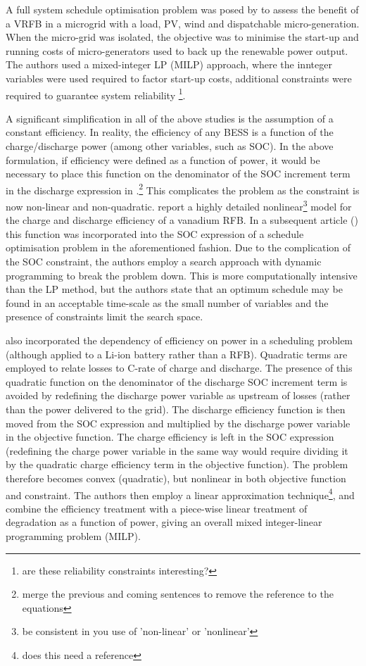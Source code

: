 \documentclass[preprint,3p,review,authoryear,10pt]{elsarticle}
\newcommand{\sol}[1]{\footnote{#1}\marginpar{\fbox{\thefootnote}}}
\begin{document}
A full system schedule optimisation problem was posed by \cite{Chen2012} to assess the benefit of a VRFB in a microgrid with a load, PV, wind and dispatchable micro-generation. When the micro-grid was isolated, the objective was to minimise the start-up and running costs of micro-generators used to back up the renewable power output. The authors used a mixed-integer LP (MILP) approach, where the innteger variables were used required to factor start-up costs, additional constraints were required to guarantee system reliability \sol{are these reliability constraints interesting?}. 

A significant simplification in all of the above studies is the assumption of a constant efficiency. In reality, the efficiency of any BESS is a function of the charge/discharge power (among other variables, such as SOC). In the above formulation, if efficiency were defined as a  function of power, it would be necessary to place this function on the denominator of the SOC increment term in the discharge expression in .\sol{merge the previous and coming sentences to remove the reference to the equations} This complicates the problem as the constraint is now non-linear and non-quadratic. \cite{Nguyen2014} report a highly detailed nonlinear\sol{be consistent in you use of 'non-linear' or 'nonlinear'} model for the charge and discharge efficiency of a vanadium RFB. In a subsequent article (\cite{Nguyen2015}) this function was incorporated into the SOC expression of a schedule optimisation problem in the aforementioned fashion. Due to the complication of the SOC constraint, the authors employ a search approach with dynamic programming to break the problem down. This is more computationally intensive than the LP method, but the authors state that an optimum schedule may be found in an acceptable time-scale as the small number of variables and the presence of constraints limit the search space.

\cite{Sarker2017} also incorporated the dependency of efficiency on power in a scheduling problem (although applied to a Li-ion battery rather than a RFB). Quadratic terms are employed to relate losses to C-rate of charge and discharge. The presence of this quadratic function on the denominator of the discharge SOC increment term is avoided by redefining the discharge power variable as upstream of losses (rather than the power delivered to the grid). The discharge efficiency function is then moved from the SOC expression and multiplied by the discharge power variable in the objective function. The charge efficiency is left in the SOC expression (redefining the charge power variable in the same way would require dividing it by the quadratic charge efficiency term in the objective function). The problem therefore becomes convex (quadratic), but nonlinear in both objective function and constraint. The authors then employ a linear approximation technique\sol{does this need a reference}, and combine the efficiency treatment with a piece-wise linear treatment of degradation as a function of power, giving an overall mixed integer-linear programming problem (MILP). 
\end{document}
